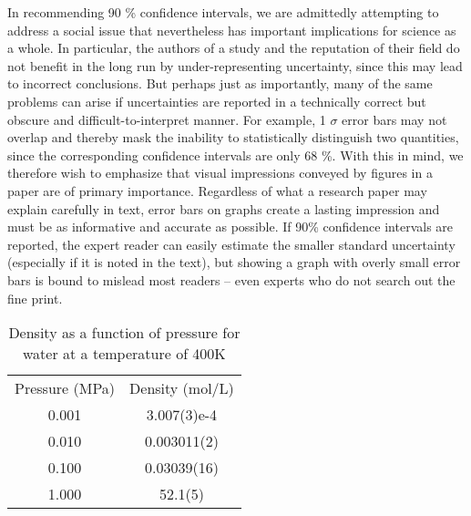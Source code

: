 In recommending 90 \% confidence intervals, we are admittedly attempting to address a social issue that nevertheless has important implications for science as a whole. In particular, the authors of a study and the reputation of their field do not benefit in the long run by under-representing uncertainty, since this may lead to incorrect conclusions. But perhaps just as importantly, many of the same problems can arise if uncertainties are reported in a technically correct but obscure and difficult-to-interpret manner. For example, 1 $\sigma$ error bars may not overlap and thereby mask the inability to statistically distinguish two quantities, since the corresponding confidence intervals are only 68 \%. With this in mind, we therefore wish to emphasize that visual impressions conveyed by figures in a paper are of primary importance. Regardless of what a research paper may explain carefully in text, error bars on graphs create a lasting impression and must be as informative and accurate as possible. If 90\% confidence intervals are reported, the expert reader can easily estimate the smaller standard uncertainty (especially if it is noted in the text), but showing a graph with overly small error bars is bound to mislead most readers -- even experts who do not search out the fine print.








\begin{table}
    \begin{tabular}{S S}
      \toprule
       {Pressure (MPa)} & {Density (mol/L)} \\
      0.001 & 3.007(3)e-4 \\
      0.010 & 0.003011(2) \\
      0.100 & 0.03039(16) \\
      1.000 & 52.1(5) \\
      \bottomrule
    \end{tabular}
  \caption{Density as a function of pressure for water at a temperature of 400K}
  \label{tab:uncertainties}
\end{table}

